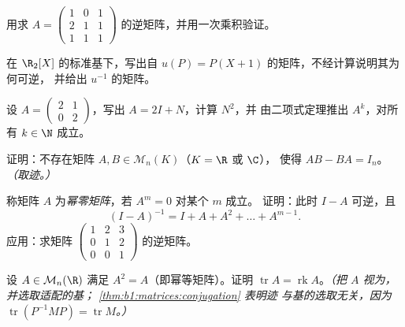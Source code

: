 \begin{exercise}[$\star$]\label{exo:b1:matrices:3}
用求 $A = \begin{pmatrix} 1 & 0 & 1\\ 2 & 1 &
1\\ 1 & 1 & 1 \end{pmatrix}$ 的逆矩阵，并用一次乘积验证。
\end{exercise}

\begin{exercise}[$\star$]\label{exo:b1:matrices:4}
在 $\R_2[X]$ 的标准基下，写出自
$u(P) = P(X + 1)$ 的矩阵，不经计算说明其为何可逆，
并给出 $u^{-1}$ 的矩阵。
\end{exercise}

\begin{exercise}[$\star\star$]\label{exo:b1:matrices:5}
设 $A = \begin{pmatrix} 2 & 1 \\ 0 & 2\end{pmatrix}$，写出 $A =
2I + N$，计算 $N^2$，并
由二项式定理推出 $A^k$，对所有 $k \in \N$ 成立。
\end{exercise}

\begin{exercise}[$\star\star$]\label{exo:b1:matrices:6}
证明：不存在矩阵 $A, B \in \mathcal{M}_n(K)$（$K = \R$ 或 $\C$），
使得 $AB - BA = I_n$。\emph{（取迹。）}
\end{exercise}

\begin{exercise}[$\star\star$]\label{exo:b1:matrices:7}
称矩阵 $A$ 为\emph{幂零矩阵}，若 $A^m = 0$ 对某个 $m$ 成立。
证明：此时 $I - A$ 可逆，且
\[
(I - A)^{-1} = I + A + A^2 + \dots + A^{m-1} .
\]
应用：求矩阵 $\begin{pmatrix} 1 & 2 & 3\\ 0 & 1 & 2\\ 0 & 0 &
1\end{pmatrix}$ 的逆矩阵。
\end{exercise}

\begin{exercise}[$\star\star$]\label{exo:b1:matrices:8}
设 $A \in \mathcal{M}_n(\R)$ 满足 $A^2 = A$（即幂等矩阵）。证明
$\operatorname{tr} A = \operatorname{rk} A$。\emph{（把
$A$ 视为，并选取适配的基；
\cref{thm:b1:matrices:conjugation} 表明迹
与基的选取无关，因为 $\operatorname{tr}(P^{-1}MP) =
\operatorname{tr} M$。）}
\end{exercise}

